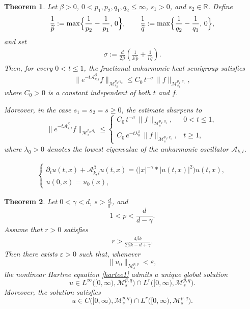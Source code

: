 \documentclass[10pt,a4paper]{amsart}
\newtheorem{theorem}{Theorem}
\def \Ad{\mathcal{A}_{k,l}}
\def\M{\mathcal{M}}
\begin{document}
\begin{theorem}
\label{BoundofH}
Let $\beta>0$, $0<p_{1},p_{2},q_{1},q_{2}\leq\infty$, $s_{1}>0$, and $s_{2}\in\mathbb{R}$. Define
\begin{align*}
\frac{1}{\widetilde{p}}
:=
\max\Bigl\{\frac{1}{p_{2}}-\frac{1}{p_{1}},\,0\Bigr\},
\qquad
\frac{1}{\widetilde{q}}
:=
\max\Bigl\{\frac{1}{q_{2}}-\frac{1}{q_{1}},\,0\Bigr\},
\end{align*}
and set
\begin{align}
\label{sigma}
\sigma
:=
\frac{d}{2\beta}
\left(
\frac{1}{k\,\widetilde{p}}
+
\frac{1}{l\,\widetilde{q}}
\right).
\end{align}
Then, for every $0<t\leq1$, the fractional anharmonic heat semigroup satisfies
\begin{equation}
\label{maininequality}
\bigl\|e^{-t\mathcal{A}_{k,l}^{\beta}}f\bigr\|_{\mathcal{M}^{p_{2},q_{2}}_{s_{2}}}
\le
C_{0}\,t^{-\sigma}\,
\|f\|_{\mathcal{M}^{p_{1},q_{1}}_{s_{1}}},
\end{equation}
where $C_{0}>0$ is a constant independent of both $t$ and $f$.

Moreover, in the case $s_{1}=s_{2}=s\ge0$, the estimate sharpens to
\begin{equation}
\label{secondconstant}
\bigl\|e^{-t\mathcal{A}_{k,l}^{\beta}}f\bigr\|_{\mathcal{M}^{p_{2},q_{2}}_{s}}
\le
\begin{cases}
C_{0}\,t^{-\sigma}\,\|f\|_{\mathcal{M}^{p_{1},q_{1}}_{s}}, & 0<t\le1,\\[0.3em]
C_{0}\,e^{-t\lambda_{0}^{\beta}}\,\|f\|_{\mathcal{M}^{p_{1},q_{1}}_{s}}, & t\ge1,
\end{cases}
\end{equation}
where $\lambda_{0}>0$ denotes the lowest eigenvalue of the anharmonic oscillator $\mathcal{A}_{k,l}$.
\end{theorem}

\begin{align}
\label{hartee1}
\begin{cases}
\partial_{t}u(t,x)+\Ad^{\beta}u(t,x)
=
\bigl(|x|^{-\gamma}*|u(t,x)|^{2}\bigr)u(t,x),\\
u(0,x)=u_{0}(x),
\end{cases}
\end{align}

\begin{theorem}
\label{welposedness1}
Let $0<\gamma<d$, $s>\frac{d}{q'}$, and
\[
1<p<\frac{d}{d-\gamma}.
\]
Assume that $r>0$ satisfies
\begin{align}
\label{r}
r>\frac{4\beta k}{2\beta k-d+\gamma}.
\end{align}
Then there exists $\varepsilon>0$ such that, whenever
\[
\|u_{0}\|_{\M^{p,q}_{s}}<\varepsilon,
\]
the nonlinear Hartree equation \eqref{hartee1} admits a unique global solution
\[
u\in L^{\infty}\bigl([0,\infty),\M^{p,q}_{s}\bigr)
   \cap L^{r}\bigl([0,\infty),\M^{p,q}_{s}\bigr).
\]
Moreover, the solution satisfies
\[
u\in C\bigl([0,\infty),\M^{p,q}_{s}\bigr)
   \cap L^{r}\bigl([0,\infty),\M^{p,q}_{s}\bigr).
\]
\end{theorem}
\end{document}
